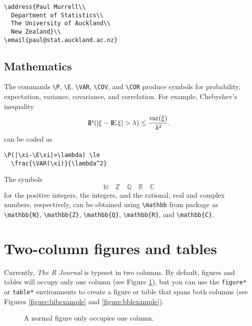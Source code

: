 \begin{verbatim}
\address{Paul Murrell\\
  Department of Statistics\\
  The University of Auckland\\
  New Zealand}\\
\email{paul@stat.auckland.ac.nz}
\end{verbatim}

\subsection{Mathematics}

The commands \verb|\P|, \verb|\E|, \verb|\VAR|, \verb|\COV|, and \verb|\COR| produce symbols
for probability, expectation, variance, covariance, and correlation.
For example, Chebyshev's inequality
\begin{displaymath}
\P(|\xi-\E\xi|>\lambda) \le \frac{\VAR(\xi)}{\lambda^2}.
\end{displaymath}
can be coded as
\begin{verbatim}
\P(|\xi-\E\xi|>\lambda) \le
  \frac{\VAR(\xi)}{\lambda^2}
\end{verbatim}

The symbols
\begin{displaymath}
\mathbb{N}\quad\mathbb{Z}\quad\mathbb{Q}\quad\mathbb{R}\quad\mathbb{C}
\end{displaymath}
for the positive integers, the integers, and the rational, real and
complex numbers, respectively, can be obtained using \verb|\mathbb| from
package  as
\verb|\mathbb{N}|, \verb|\mathbb{Z}|, \verb|\mathbb{Q}|, \verb|\mathbb{R}|,
and \verb|\mathbb{C}|.

\section{Two-column figures and tables}

Currently, \emph{The R Journal} is typeset in two columns.
By default, figures and tables will occupy only one
column (see Figure \ref{figure:onecolfig}),
but you can use the \verb|figure*| or
\verb|table*| environments to create a figure or
table that spans both columns (see Figures \ref{figure:bibexample}
and \ref{figure:bblexample}).

\begin{figure}
\vspace*{.1in}
\caption{\label{figure:onecolfig}
A normal figure only occupies one column.}
\end{figure}

